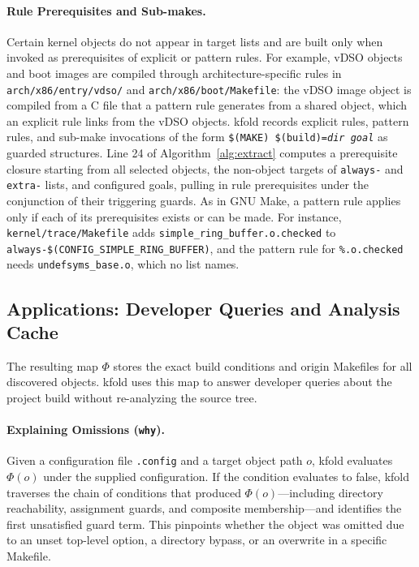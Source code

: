 \documentclass[acmsmall]{acmart}
\newcommand{\tool}{\textsf{kfold}\xspace}
\begin{document}
\paragraph{Rule Prerequisites and Sub-makes.}
Certain kernel objects do not appear in target lists and are built only when invoked as prerequisites of explicit or pattern rules.
For example, vDSO objects and boot images are compiled through architecture-specific rules in \texttt{arch/x86/entry/vdso/} and \texttt{arch/x86/boot/Makefile}: the vDSO image object is compiled from a C file that a pattern rule generates from a shared object, which an explicit rule links from the vDSO objects.
\tool records explicit rules, pattern rules, and sub-make invocations of the form \texttt{\$(MAKE) \$(build)=\textit{dir} \textit{goal}} as guarded structures.
Line 24 of Algorithm~\ref{alg:extract} computes a prerequisite closure starting from all selected objects, the non-object targets of \texttt{always-} and \texttt{extra-} lists, and configured goals, pulling in rule prerequisites under the conjunction of their triggering guards.
As in GNU Make, a pattern rule applies only if each of its prerequisites exists or can be made.
For instance, \texttt{kernel/trace/Makefile} adds \texttt{simple\_ring\_buffer.o.checked} to \texttt{always-\$(CONFIG\_SIMPLE\_RING\_BUFFER)}, and the pattern rule for \texttt{\%.o.checked} needs \texttt{undefsyms\_base.o}, which no list names.

\subsection{Applications: Developer Queries and Analysis Cache}\label{sec:technique:queries}

The resulting map $\Phi$ stores the exact build conditions and origin Makefiles for all discovered objects.
\tool uses this map to answer developer queries about the project build without re-analyzing the source tree. 

\paragraph{Explaining Omissions (\texttt{why}).}
Given a configuration file \texttt{.config} and a target object path $o$, \tool evaluates $\Phi(o)$ under the supplied configuration.
If the condition evaluates to false, \tool traverses the chain of conditions that produced $\Phi(o)$---including directory reachability, assignment guards, and composite membership---and identifies the first unsatisfied guard term.
This pinpoints whether the object was omitted due to an unset top-level option, a directory bypass, or an overwrite in a specific Makefile.
\end{document}
